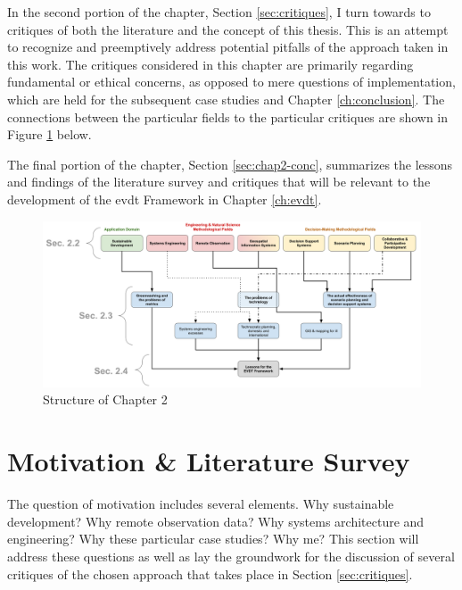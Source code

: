 In the second portion of the chapter, Section \ref{sec:critiques}, I turn towards to critiques of both the literature and the concept of this thesis. This is an attempt to recognize and preemptively address potential pitfalls of the approach taken in this work. The critiques considered in this chapter are primarily regarding fundamental or ethical concerns, as opposed to mere questions of implementation, which are held for the subsequent case studies and Chapter \ref{ch:conclusion}. The connections between the particular fields to the particular critiques are shown in Figure \ref{fig:lit_survey_structure} below.

The final portion of the chapter, Section \ref{sec:chap2-conc}, summarizes the lessons and findings of the literature survey and critiques that will be relevant to the development of the \ac{evdt} Framework in Chapter \ref{ch:evdt}.

\begin{landscape}
\begin{figure}[t]
	\centering
	\includegraphics[width=1.3\textwidth]{Figures/chap2/lit_survey_structure.png}
	\caption[Structure of Chapter 2]{Structure of Chapter 2}
	\label{fig:lit_survey_structure}
\end{figure}
\end{landscape}

\section{Motivation \& Literature Survey} \label{sec:motivation}

The question of motivation includes several elements. Why sustainable development? Why remote observation data? Why systems architecture and engineering? Why these particular case studies? Why me? This section will address these questions as well as lay the groundwork for the discussion of several critiques of the chosen approach that takes place in Section \ref{sec:critiques}.

